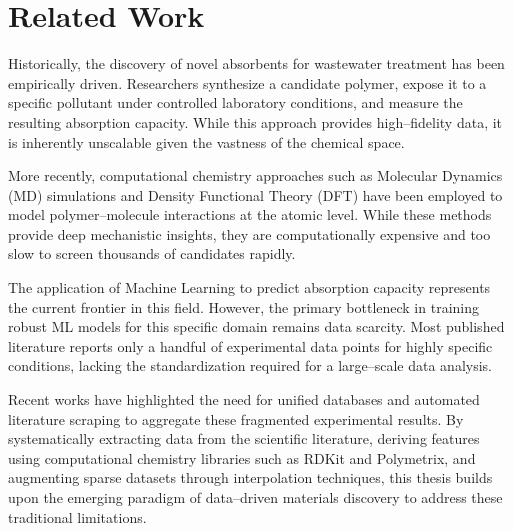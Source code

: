 \section{Related Work }
\label{sec:related_work}

Historically, the discovery of novel absorbents for wastewater treatment has been empirically driven. Researchers synthesize a candidate polymer, expose it to a specific pollutant under controlled laboratory conditions, and measure the resulting absorption capacity. While this approach provides high--fidelity data, it is inherently unscalable given the vastness of the chemical space.

More recently, computational chemistry approaches such as Molecular Dynamics (MD) simulations \cite{MDPolymerMoleculeInteraction} and Density Functional Theory (DFT) \cite{DFTPolymerStructure} have been employed to model polymer--molecule interactions at the atomic level. While these methods provide deep mechanistic insights, they are computationally expensive and too slow to screen thousands of candidates rapidly.

The application of Machine Learning to predict absorption capacity represents the current frontier in this field. However, the primary bottleneck in training robust ML models for this specific domain remains data scarcity. Most published literature reports only a handful of experimental data points for highly specific conditions, lacking the standardization required for a large--scale data analysis. 

Recent works have highlighted the need for unified databases and automated literature scraping to aggregate these fragmented experimental results. By systematically extracting data from the scientific literature, deriving features using computational chemistry libraries such as RDKit and Polymetrix\cite{polymetrix},  and augmenting sparse datasets through interpolation techniques, this thesis builds upon the emerging paradigm of data--driven materials discovery to address these traditional limitations.
